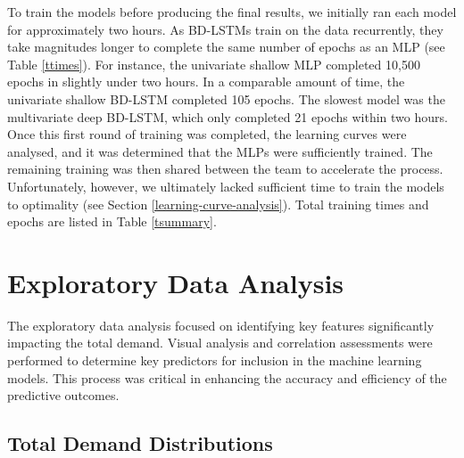 \documentclass[mstat,12pt]{unswthesis}
\begin{document}
To train the models before producing the final results, we initially ran each model for approximately two hours. As BD-LSTMs train on the data recurrently, they take magnitudes longer to complete the same number of epochs as an MLP (see Table \ref{ttimes}). For instance, the univariate shallow MLP completed 10,500 epochs in slightly under two hours. In a comparable amount of time, the univariate shallow BD-LSTM completed 105 epochs. The slowest model was the multivariate deep BD-LSTM, which only completed 21 epochs within two hours. Once this first round of training was completed, the learning curves were analysed, and it was determined that the MLPs were sufficiently trained. The remaining training was then shared between the team to accelerate the process. Unfortunately, however, we ultimately lacked sufficient time to train the models to optimality (see Section \ref{learning-curve-analysis}). Total training times and epochs are listed in Table \ref{tsummary}.

 \ttimes
{} \tsummary

\hypertarget{exploratory-data-analysis}{%
\chapter{Exploratory Data Analysis}\label{exploratory-data-analysis}}
The exploratory data analysis focused on identifying key features significantly impacting the total demand. Visual analysis and correlation assessments were performed to determine key predictors for inclusion in the machine learning models. This process was critical in enhancing the accuracy and efficiency of the predictive outcomes.

\hypertarget{demand-distributions}{%
\section{Total Demand Distributions}\label{demand-distributions}}
\end{document}
